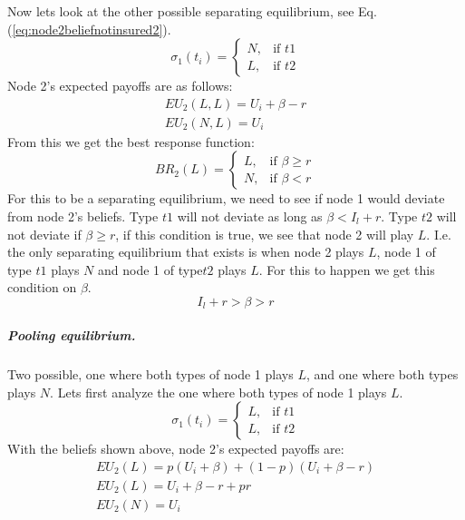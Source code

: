 Now lets look at the other possible separating equilibrium, see Eq.(\ref{eq:node2beliefnotinsured2}).
\begin{equation}
    \sigma_{1}(t_{i})= 
\begin{cases}
   N,& \text{if } t1\\
   L,& \text{if } t2  
\end{cases}
\label{eq:node2beliefnotinsured2}
\end{equation}
Node 2's expected payoffs are as follows:
\begin{eqnarray}
EU_{2}(L,L)=U_{i}+\beta-r \\
EU_{2}(N,L)=U_{i}
\end{eqnarray}
From this we get the best response function:
\begin{equation}
BR_{2}(L)=
\begin{cases}
L ,& \text{if } \beta\geq r \\
N ,& \text{if } \beta<r 
\end{cases}
\end{equation}
For this to be a separating equilibrium, we need to see if node 1 would deviate from node 2's beliefs. 
Type $t1$ will not deviate as long as $\beta<I_{l}+r$. Type $t2$ will not deviate if $\beta \geq r$, if this condition is true, we see that node 2 will play $L$. I.e. the only separating equilibrium that exists is when node 2 plays $L$, node 1 of type $t1$ plays $N$ and node 1 of type$t2$ plays $L$.
For this to happen we get this condition on $\beta$. \begin{equation}
I_{l}+r>\beta>r
\label{eq:conditionseparatingequilibrium}
\end{equation}
\subparagraph{Pooling equilibrium.}
Two possible, one where both types of node 1 plays $L$, and one where both types plays $N$. Lets first analyze the one where both types of node 1 plays $L$.
\begin{equation}
    \sigma_{1}(t_{i})= 
\begin{cases}
   L,& \text{if } t1\\
   L,& \text{if } t2  
\end{cases}
\label{eq:node2beliefnotinsuredpooling}
\end{equation}
With the beliefs shown above, node 2's expected payoffs are: \begin{eqnarray}
EU_{2}(L)=p(U_{i}+\beta)+(1-p)(U_{i}+\beta-r) \nonumber \\
EU_{2}(L)=U_{i}+\beta-r+pr \\
EU_{2}(N)=U_{i}
\end{eqnarray}

